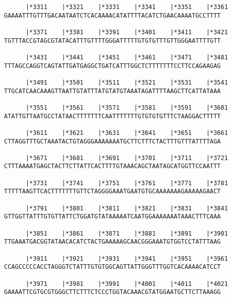 \documentclass{article}
\begin{document}
\begin{Verbatim}
      |*3311    |*3321    |*3331    |*3341    |*3351    |*3361
GAAAATTTGTTTGACAATAATCTCACAAAACATATTTTACATCTGAACAAAATGCCTTTT
                                                            
      |*3371    |*3381    |*3391    |*3401    |*3411    |*3421
TGTTTACCGTAGCGTATACATTTGTTTTGGGATTTTTGTGTGTTTGTTGGGAATTTTGTT
                                                            
      |*3431    |*3441    |*3451    |*3461    |*3471    |*3481
TTTAGCCAGGTCAGTATTGATGAGGCTGATCATTTGGCTCTTTTTTTCCTTCCAGAAGAG
                                                            
      |*3491    |*3501    |*3511    |*3521    |*3531    |*3541
TTGCATCAACAAAGTTAATTGTATTTATGTATGTAAATAGATTTTAAGCTTCATTATAAA
                                                            
      |*3551    |*3561    |*3571    |*3581    |*3591    |*3601
ATATTGTTAATGCCTATAACTTTTTTTCAATTTTTTTGTGTGTGTTTCTAAGGACTTTTT
                                                            
      |*3611    |*3621    |*3631    |*3641    |*3651    |*3661
CTTAGGTTTGCTAAATACTGTAGGGAAAAAAATGCTTCTTTCTACTTTGTTTATTTTAGA
                                                            
      |*3671    |*3681    |*3691    |*3701    |*3711    |*3721
CTTTAAAATGAGCTACTTCTTATTCACTTTTGTAAACAGCTAATAGCATGGTTCCAATTT
                                                            
      |*3731    |*3741    |*3751    |*3761    |*3771    |*3781
TTTTTAAGTTCACTTTTTTTGTTCTAGGGGAAATGAATGTGCAAAAAAAGAAAAAGAACT
                                                            
      |*3791    |*3801    |*3811    |*3821    |*3831    |*3841
GTTGGTTATTTGTGTTATTCTGGATGTATAAAAATCAATGGAAAAAAATAAACTTTCAAA
                                                            
      |*3851    |*3861    |*3871    |*3881    |*3891    |*3901
TTGAAATGACGGTATAACACATCTACTGAAAAAGCAACGGGAAATGTGGTCCTATTTAAG
                                                            
      |*3911    |*3921    |*3931    |*3941    |*3951    |*3961
CCAGCCCCCACCTAGGGTCTATTTGTGTGGCAGTTATTGGGTTTGGTCACAAAACATCCT
                                                            
      |*3971    |*3981    |*3991    |*4001    |*4011    |*4021
GAAAATTCGTGCGTGGGCTTCTTTCTCCCTGGTACAAACGTATGGAATGCTTCTTAAAGG
                                                            

\end{Verbatim}
\end{document}
